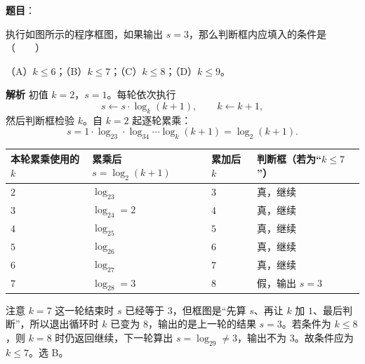 \begin{answer}

\textbf{题目}：

执行如图所示的程序框图，如果输出 $s=3$，那么判断框内应填入的条件是\mbox{（　　）}
\nopagebreak[4]
\begin{center}\end{center}
\nopagebreak[4]
（A）$k\leqslant6$；（B）$k\leqslant7$；（C）$k\leqslant8$；（D）$k\leqslant9$。

\textbf{解析}
初值 $k=2$，$s=1$。每轮依次执行
\nopagebreak[4]
\[s\leftarrow s\cdot\log_k(k+1),\qquad k\leftarrow k+1,\]
然后判断框检验 $k$。自 $k=2$ 起逐轮累乘：
\nopagebreak[4]
\[s=1\cdot\log_23\cdot\log_34\cdots\log_{k}(k+1)=\log_2(k+1).\]

\begin{center}
\begin{tabular}{llll}
\toprule
本轮累乘使用的 $k$ & 累乘后 $s=\log_2(k+1)$ & 累加后 $k$ & 判断框（若为“$k\leqslant7$”） \\
\midrule
$2$ & $\log_23$ & $3$ & 真，继续 \\
$3$ & $\log_24=2$ & $4$ & 真，继续 \\
$4$ & $\log_25$ & $5$ & 真，继续 \\
$5$ & $\log_26$ & $6$ & 真，继续 \\
$6$ & $\log_27$ & $7$ & 真，继续 \\
$7$ & $\log_28=3$ & $8$ & 假，输出 $s=3$ \\
\bottomrule
\end{tabular}
\end{center}

注意 $k=7$ 这一轮结束时 $s$ 已经等于 $3$，但框图是“先算 $s$、再让 $k$ 加 $1$、最后判断”，所以退出循环时 $k$ 已变为 $8$，输出的是上一轮的结果 $s=3$。若条件为 $k\leqslant8$，则 $k=8$ 时仍返回继续，下一轮算出 $s=\log_29\neq3$，输出不为 $3$。故条件应为 $k\leqslant7$。选 B。


\end{answer}
